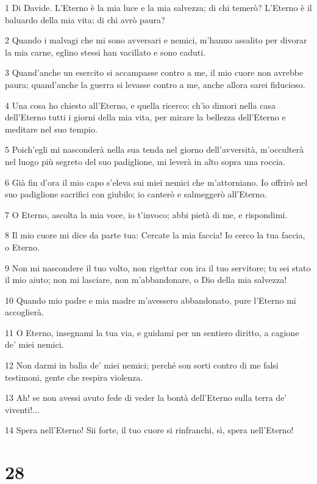 \par 1 Di Davide. L'Eterno è la mia luce e la mia salvezza; di chi temerò? L'Eterno è il baluardo della mia vita; di chi avrò paura?
\par 2 Quando i malvagi che mi sono avversari e nemici, m'hanno assalito per divorar la mia carne, eglino stessi han vacillato e sono caduti.
\par 3 Quand'anche un esercito si accampasse contro a me, il mio cuore non avrebbe paura; quand'anche la guerra si levasse contro a me, anche allora sarei fiducioso.
\par 4 Una cosa ho chiesto all'Eterno, e quella ricerco: ch'io dimori nella casa dell'Eterno tutti i giorni della mia vita, per mirare la bellezza dell'Eterno e meditare nel suo tempio.
\par 5 Poich'egli mi nasconderà nella sua tenda nel giorno dell'avversità, m'occulterà nel luogo più segreto del suo padiglione, mi leverà in alto sopra una roccia.
\par 6 Già fin d'ora il mio capo s'eleva sui miei nemici che m'attorniano. Io offrirò nel suo padiglione sacrifici con giubilo; io canterò e salmeggerò all'Eterno.
\par 7 O Eterno, ascolta la mia voce, io t'invoco; abbi pietà di me, e rispondimi.
\par 8 Il mio cuore mi dice da parte tua: Cercate la mia faccia! Io cerco la tua faccia, o Eterno.
\par 9 Non mi nascondere il tuo volto, non rigettar con ira il tuo servitore; tu sei stato il mio aiuto; non mi lasciare, non m'abbandonare, o Dio della mia salvezza!
\par 10 Quando mio padre e mia madre m'avessero abbandonato, pure l'Eterno mi accoglierà.
\par 11 O Eterno, insegnami la tua via, e guidami per un sentiero diritto, a cagione de' miei nemici.
\par 12 Non darmi in balìa de' miei nemici; perché son sorti contro di me falsi testimoni, gente che respira violenza.
\par 13 Ah! se non avessi avuto fede di veder la bontà dell'Eterno sulla terra de' viventi!...
\par 14 Spera nell'Eterno! Sii forte, il tuo cuore si rinfranchi, sì, spera nell'Eterno!

\chapter{28}

